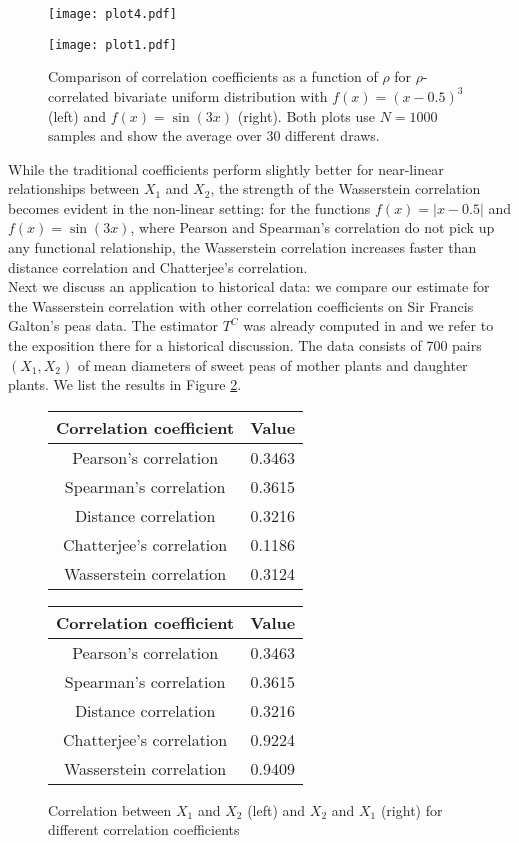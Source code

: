 \documentclass[10pt]{amsart}
\begin{document}
\begin{figure}[h!]
\begin{center}
\begin{minipage}{0.48\textwidth}
\texttt{[image: plot4.pdf]}
\end{minipage}
\quad
\begin{minipage}{0.48\textwidth}
\texttt{[image: plot1.pdf]}
\end{minipage}
\caption{Comparison of correlation coefficients as a function of $\rho$ for $\rho$-correlated bivariate uniform distribution with $f(x)=(x-0.5)^3$ (left) and $f(x)=\sin(3x)$ (right). Both plots use $N=1000$ samples and show the average over $30$ different draws.}\label{fig:3}
\end{center}
\end{figure}

While the traditional coefficients perform slightly better for near-linear relationships between $X_1$ and $X_2$, the strength of the Wasserstein correlation becomes evident in the non-linear setting: for the functions $f(x)=|x-0.5|$ and $f(x)=\sin(3x)$, where Pearson and Spearman's correlation do not pick up any functional relationship, the Wasserstein correlation increases faster than distance correlation and Chatterjee's correlation.\\


Next we discuss an application to historical data: we compare our estimate for the Wasserstein correlation with other correlation coefficients on Sir Francis Galton's peas data. The estimator $T^C$ was already computed in \cite[Section 3]{chatterjee2020new} and we refer to the exposition there for a historical discussion. The data consists of 700 pairs $(X_1, X_2)$ of mean diameters of sweet peas of mother plants and daughter plants. We list the results in Figure \ref{fig:4}.

\begin{figure}[h!]
\centering
\begin{tabular}{cc}
Correlation coefficient & Value  \\ 
  \hline
 Pearson's correlation & 0.3463  \\ 
 Spearman's correlation & 0.3615\\
 Distance correlation & 0.3216\\
 Chatterjee's correlation & 0.1186 \\
 Wasserstein correlation & 0.3124  
\end{tabular}
\qquad\qquad
\begin{tabular}{cc}
Correlation coefficient & Value  \\ 
  \hline
 Pearson's correlation & 0.3463  \\ 
 Spearman's correlation & 0.3615 \\
 Distance correlation & 0.3216\\
 Chatterjee's correlation & 0.9224 \\
 Wasserstein correlation & 0.9409  
\end{tabular}
\caption{Correlation between $X_1$ and $X_2$ (left) and $X_2$ and $X_1$ (right) for different correlation coefficients}\label{fig:4}
\end{figure}
\end{document}
